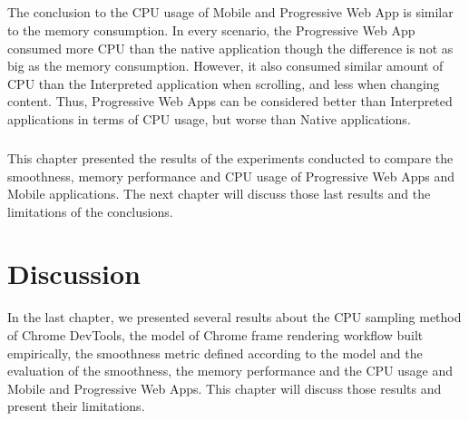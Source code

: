 \documentclass{kththesis}
\begin{document}

\paragraph{}
The conclusion to the CPU usage of Mobile and Progressive Web App is similar to the memory consumption. In every scenario, the Progressive Web App consumed more CPU than the native application though the difference is not as big as the memory consumption. However, it also consumed similar amount of CPU than the Interpreted application when scrolling, and less when changing content. Thus, Progressive Web Apps can be considered better than Interpreted applications in terms of CPU usage, but worse than Native applications.

\paragraph{}
This chapter presented the results of the experiments conducted to compare the smoothness, memory performance and CPU usage of Progressive Web Apps and Mobile applications. The next chapter will discuss those last results and the limitations of the conclusions.


\chapter{Discussion}
\label{ch:discussion}

In the last chapter, we presented several results about the CPU sampling method of Chrome DevTools, the model of Chrome frame rendering workflow built empirically, the smoothness metric defined according to the model and the evaluation of the smoothness, the memory performance and the CPU usage and Mobile and Progressive Web Apps. This chapter will discuss those results and present their limitations.
\end{document}
